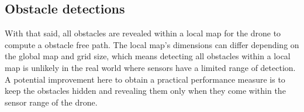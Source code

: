 \subsection{Obstacle detections}
With that said, all obstacles are revealed within a local map for the drone to compute a obstacle free path.
The local map's dimensions can differ depending on the global map and grid size, which means detecting all obstacles within a local map is unlikely in the real world where sensors have a limited range of detection.
A potential improvement here to obtain a practical performance measure is to keep the obstacles hidden and revealing them only when they come within the sensor range of the drone.

